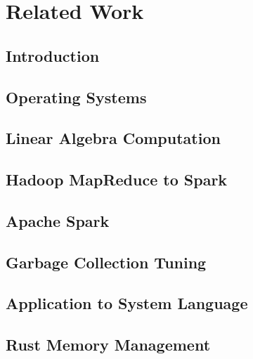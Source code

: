 \chapter{Related Work}
\label{chapter:relatedwork}
\thispagestyle{myheadings}

\graphicspath{{2_RelatedWork/Figures/}}

\section{Introduction}
\label{sec:related_intro}


\section{Operating Systems}
\label{sec:os}


\section{Linear Algebra Computation}
\label{sec:linalg}


\section{Hadoop MapReduce to Spark}
\label{sec:hadoopspark}


\section{Apache Spark}
\label{sec:spark}


\section{Garbage Collection Tuning}
\label{sec:gc}


\section{Application to System Language}
\label{sec:appsys}


\section{Rust Memory Management}
\label{sec:rustmem}


